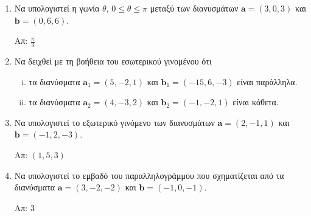 \documentclass[a4paper,table]{report}
\renewcommand{\vec}{\mathbf}
\begin{document}
\begin{center}
  \minibox{\large \bfseries \textcolor{Col1}{Ασκήσεις στα Διανύσματα}}
\end{center}

\vspace{\baselineskip}

\begin{enumerate}
  \item Να υπολογιστεί η γωνία $ \theta $, $ 0\leq \theta \leq \pi $ μεταξύ των διανυσμάτων $
    \vec{a} = (3,0,3) $ και $ \vec{b} = (0,6,6) $.

    \hfill Απ: $ \frac{\pi}{3} $

  \item Να δειχθεί με τη βοήθεια του εσωτερικού γινομένου ότι
    \begin{enumerate}[i)]
      \item τα διανύσματα $ \vec{a}_1 = (5,-2,1) $ και $ \vec{b}_1 = (-15,6,-3) $ είναι παράλληλα.
      \item τα διανύσματα $ \vec{a}_2 = (4,-3,2) $ και $ \vec{b}_2 = (-1,-2,1) $ είναι κάθετα.
    \end{enumerate}

  \item Να υπολογιστεί το εξωτερικό γινόμενο των διανυσμάτων $ \vec{a} = (2,-1,1) $ και $ \vec{b} = (-1,2,-3) $.

    \hfill Απ: $ (1,5,3) $

  \item Να υπολογιστεί το εμβαδό του παραλληλογράμμου που σχηματίζεται από τα διανύσματα $ \vec{a} = (3,-2,-2) $ και $ \vec{b} = (-1,0,-1) $.

    \hfill Απ: $3 $ 
\end{enumerate}
\end{document}
